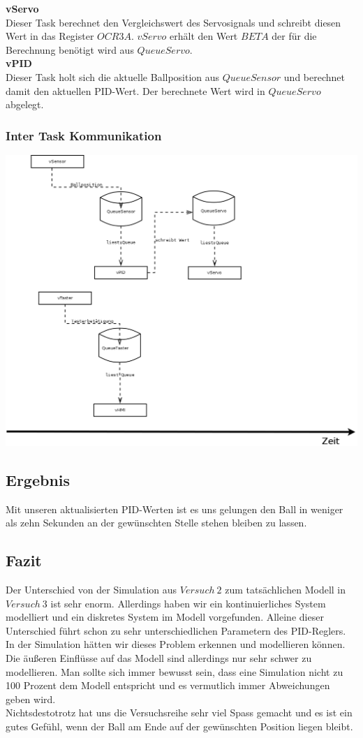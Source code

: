 {\bfseries vServo} \\
Dieser Task berechnet den Vergleichswert des Servosignals und schreibt diesen Wert in das Register $OCR3A$. $vServo$ erhält den Wert $BETA$ der für die Berechnung benötigt wird aus $QueueServo$.\\
{\bfseries vPID} \\
Dieser Task holt sich die aktuelle Ballposition aus $QueueSensor$ und berechnet damit den aktuellen PID-Wert. Der berechnete Wert wird in $QueueServo$ abgelegt.\\


\subsubsection{Inter Task Kommunikation}
\includegraphics[scale=0.3]{UML.png}

\subsection{Ergebnis}
Mit unseren aktualisierten PID-Werten ist es uns gelungen den Ball in weniger als zehn Sekunden an der gewünschten Stelle stehen bleiben zu lassen.\\

\subsection{Fazit}
Der Unterschied von der Simulation aus $Versuch\ 2$ zum tatsächlichen Modell in $Versuch\ 3$ ist sehr enorm. Allerdings haben wir ein kontinuierliches System modelliert und ein diskretes System im Modell vorgefunden. Alleine dieser Unterschied führt schon zu sehr unterschiedlichen Parametern des PID-Reglers. In der Simulation hätten wir dieses Problem erkennen und modellieren können. \\
Die äußeren Einflüsse auf das Modell sind allerdings nur sehr schwer zu modellieren. Man sollte sich immer bewusst sein, dass eine Simulation nicht zu 100 Prozent dem Modell entspricht und es vermutlich immer Abweichungen geben wird. \\
Nichtsdestotrotz hat uns die Versuchsreihe sehr viel Spass gemacht und es ist ein gutes Gefühl, wenn der Ball am Ende auf der gewünschten Position liegen bleibt.